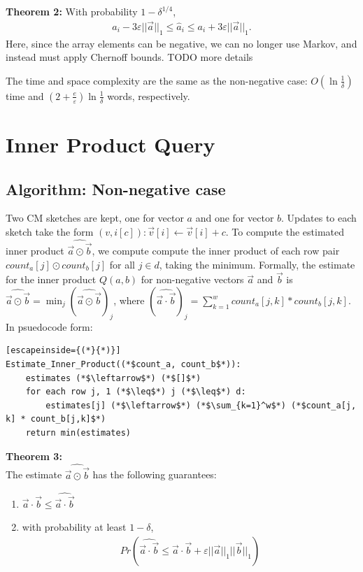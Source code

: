 \documentclass[11pt]{article}
\begin{document}
\textbf{Theorem 2:} With probability $1 - \delta^{1/4}$,
\begin{align}
    a_i - 3\varepsilon||\vec{a}||_1 \leq \hat{a}_i \leq a_i + 3\varepsilon||\vec{a}||_1. 
\end{align}
Here, since the array elements can be negative, we can no longer use Markov, and instead must apply Chernoff
bounds. TODO more details

The time and space complexity are the same as the non-negative case: $O(\ln
\frac{1}{\delta})$ time and $(2 + \frac{e}{\varepsilon})\ln \frac{1}{\delta}$
words, respectively. {

\section{Inner Product Query}
	\subsection{Algorithm: Non-negative case}
        Two CM sketches are kept, one for vector $a$ and one for vector $b$. Updates to each sketch take the form $(v, i[c]): \vec v[i] \leftarrow \vec v[i] + c$. To compute the estimated inner product $\widehat{\vec{a} \odot \vec{b}}$, we compute compute the inner product of each row pair $count_a[j] \odot count_b[j]$ for all $j \in d$, taking the minimum. Formally, the estimate for the inner product $\mathit{Q}(a,b)$ for non-negative vectors $\vec{a}$ and $\vec{b}$ is $\widehat{\vec{a} \odot \vec{b}} = \min_j(\widehat{\vec a \odot \vec b})_j$, where $(\widehat{\vec a \cdot \vec b})_j = \sum_{k=1}^w count_a[j,k] * count_b[j,k]$. In psuedocode form:\\
\begin{lstlisting}[escapeinside={(*}{*)}]
Estimate_Inner_Product((*$count_a, count_b$*)): 
    estimates (*$\leftarrow$*) (*$[]$*)
    for each row j, 1 (*$\leq$*) j (*$\leq$*) d:
        estimates[j] (*$\leftarrow$*) (*$\sum_{k=1}^w$*) (*$count_a[j, k] * count_b[j,k]$*)
    return min(estimates) 
\end{lstlisting}
\textbf{Theorem 3:}\\
        The estimate $\widehat{\vec{a} \odot \vec{b}}$ has the following guarantees:
        \begin{enumerate}[label=\textnormal{(\arabic*)}]
            \item $\vec a \cdot \vec b \leq \widehat{\vec a \cdot \vec b}$
            \item with probability at least $1 - \delta$, 
            \begin{align}
		        Pr(\widehat{\vec a \cdot \vec b} \leq \vec a \cdot \vec b + \varepsilon||\vec a||_1||\vec b||_1)
            \end{align}
        \end{enumerate}

}
\end{document}
